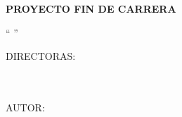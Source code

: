 {\begin{titlepage}
\begin{center}
        \Large\textrm{\textbf{PROYECTO FIN DE CARRERA}}\\
        \vspace{2cm}

        \Large\textrm{\textquotedblleft
                      \MakeUppercase{\TituloPFC}\textquotedblright}\\
        \vspace{2cm}

        \Large\textrm{DIRECTORAS:}\\
	\Large\textrm{\DirectorPFC}\\
	\Large\textrm{\CoDirectorPFC}\\
	\vspace{1.5cm}

	\Large\textrm{AUTOR:\\ \AutorPFC}\\
	\vspace{0.5cm}
	
	\end{center}
	\begin{flushright}
		\large\textrm{\Convocatoria}
	\end{flushright}

        \pagestyle{empty}
	\cleardoublepage
    
    \end{titlepage}
    
}
